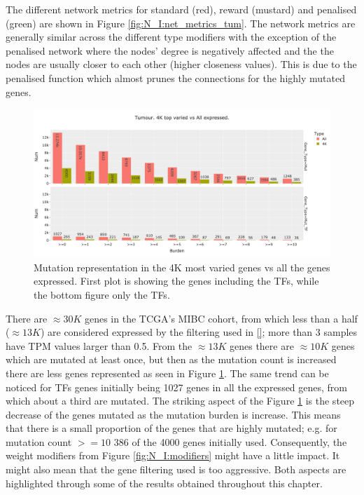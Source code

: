 The different network metrics for standard (red), reward (mustard) and penalised (green) are shown in Figure \ref{fig:N_I:net_metrics_tum}. The network metrics are generally similar across the different type modifiers with the exception of the penalised network where the nodes' degree is negatively affected and the the nodes are usually closer to each other (higher closeness values). This is due to the penalised function which almost prunes the connections for the highly mutated genes.

\begin{figure}[!htb]    \centering\includegraphics[width=1.0\textwidth,height=0.6\textheight,keepaspectratio]{Sections/Network_I/Resources/Tum_network/MutTF_representation_4K-all.png}
    \caption{Mutation representation in the 4K most varied genes vs all the genes expressed. First plot is showing the genes including the TFs, while the bottom figure only the TFs.}
    \label{fig:N_I:mut_rep_tum}
\end{figure}


There are $\approx30K$ genes in the TCGA's MIBC cohort, from which less than a half ($\approx13K$) are considered expressed by the filtering used in \ref{}; more than 3 samples have TPM values larger than 0.5. From the $\approx13K$ genes there are $\approx10K$ genes which are mutated at least once, but then as the mutation count is increased there are less genes represented as seen in Figure \ref{fig:N_I:mut_rep_tum}. The same trend can be noticed for TFs genes initially being 1027 genes in all the expressed genes, from which about a third are mutated. The striking aspect of the Figure \ref{fig:N_I:mut_rep_tum} is the steep decrease of the genes mutated as the mutation burden is increase. This means that there is a small proportion of the genes that are highly mutated; e.g. for mutation count $>=10$ 386 of the 4000 genes initially used. Consequently, the weight modifiers from Figure \ref{fig:N_I:modifiers} might have a little impact. It might also mean that the gene filtering used is too aggressive. Both aspects are highlighted through some of the results obtained throughout this chapter.


